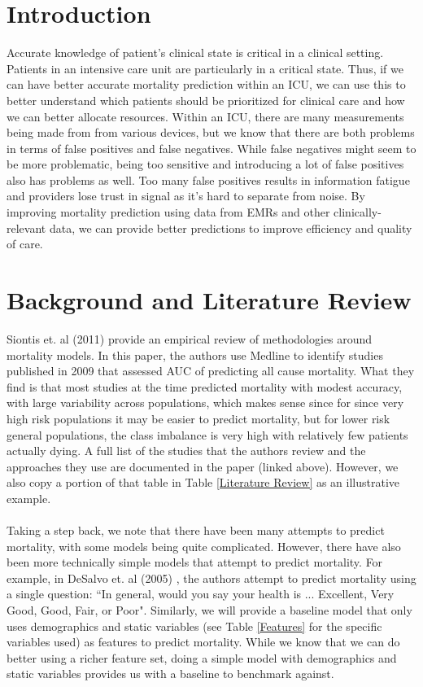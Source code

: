 \documentclass[12pt, final]{article}
\begin{document}
\section{Introduction} \label{Introduction}
Accurate knowledge of patient's clinical state is critical in a clinical setting. Patients in an intensive care unit are particularly in a critical state. Thus, if we can have better accurate mortality prediction within an ICU, we can use this to better understand which patients should be prioritized for clinical care and how we can better allocate resources. Within an ICU, there are many measurements being made from from various devices, but we know that there are both problems in terms of false positives and false negatives. While false negatives might seem to be more problematic, being too sensitive and introducing a lot of false positives also has problems as well. Too many false positives results in information fatigue and providers lose trust in signal as it's hard to separate from noise. By improving mortality prediction using data from EMRs and other clinically-relevant data, we can provide better predictions to improve efficiency and quality of care.

\section{Background and Literature Review}
\label{Background and Lit Review}
Siontis et. al (2011) \cite{Siontis} provide an empirical review of methodologies around mortality models. In this paper, the authors use Medline to identify studies published in 2009 that assessed AUC of predicting all cause mortality. What they find is that most studies at the time predicted mortality with modest accuracy, with large variability across populations, which makes sense since for since very high risk populations it may be easier to predict mortality, but for lower risk general populations, the class imbalance is very high with relatively few patients actually dying. A full list of the studies that the authors review and the approaches they use are documented in the paper (linked above). However, we also copy a portion of that table in Table \ref{Literature Review} as an illustrative example.
\\
\\
Taking a step back, we note that there have been many attempts to predict mortality, with some models being quite complicated. However, there have also been more technically simple models that attempt to predict mortality. For example, in DeSalvo et. al (2005) \cite{DeSalvo}, the authors attempt to predict mortality using a single question: ``In general, would you say your health is ... Excellent, Very Good, Good, Fair, or Poor". Similarly, we will provide a baseline model that only uses demographics and static variables (see Table \ref{Features} for the specific variables used) as features to predict mortality. While we know that we can do better using a richer feature set, doing a simple model with demographics and static variables provides us with a baseline to benchmark against.
\end{document}

